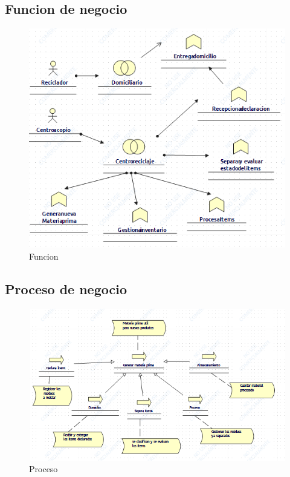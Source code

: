 \subsection{Funcion de negocio}
\begin{figure}[h!]
	\centering
	\includegraphics[width=0.8\linewidth]{Arquitectura/Negocio/imgs/Funcion de negocio.png}
	\caption{Funcion}
\end{figure}
\newpage

\subsection{Proceso de negocio}
\begin{figure}[h!]
	\centering
	\includegraphics[width=0.8\linewidth]{Arquitectura/Negocio/imgs/Proceso de negocio.png}
	\caption{Proceso}
\end{figure}
\newpage

